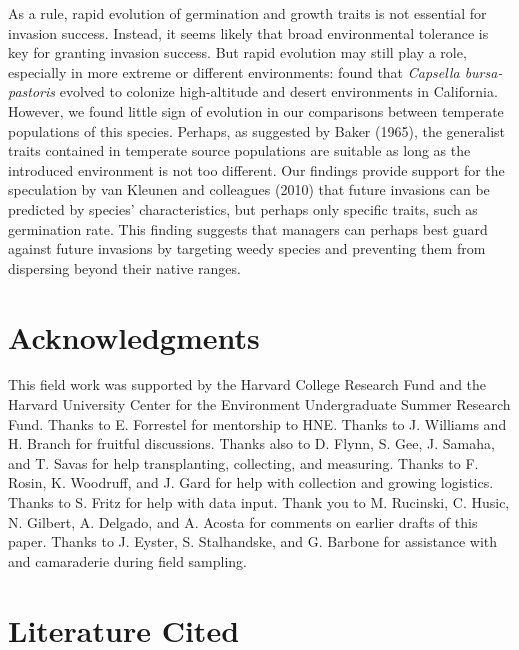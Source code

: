 \documentclass[12pt]{article}\usepackage[]{graphicx}\usepackage[]{color}
\begin{document}
	As a rule, rapid evolution of germination and growth traits is not essential for invasion success. Instead, it seems likely that broad environmental tolerance is key for granting invasion success.  But rapid evolution may still play a role, especially in more extreme or different environments:  \textcite{Linde2001} found that \textit{Capsella bursa-pastoris} evolved to colonize high-altitude and desert environments in California. However, we found little sign of evolution in our comparisons between temperate populations of this species. Perhaps, as suggested by Baker (1965), the generalist traits contained in temperate source populations are suitable as long as the introduced environment is not too different. Our findings provide support for  the speculation by van Kleunen and colleagues (2010) that future invasions can be predicted by species' characteristics, but perhaps only specific traits, such as germination rate. This finding suggests that managers can perhaps best guard against future invasions by targeting weedy species and preventing them from dispersing beyond their native ranges. 

	
\section{Acknowledgments}
This field work was supported by the Harvard College Research Fund and the Harvard University Center for the Environment Undergraduate Summer Research Fund. Thanks to E. Forrestel for mentorship to HNE. Thanks to J. Williams and H. Branch for fruitful discussions. Thanks also to D. Flynn, S. Gee, J. Samaha, and T. Savas for help transplanting, collecting, and measuring. Thanks to F. Rosin, K. Woodruff, and J. Gard for help with collection and growing logistics. Thanks to S. Fritz for help with data input. Thank you to M. Rucinski, C. Husic, N. Gilbert, A. Delgado, and A. Acosta for comments on earlier drafts of this paper. Thanks to J. Eyster, S. Stalhandske, and G. Barbone for assistance with and camaraderie during field sampling. 

	

\section{Literature Cited}
\printbibliography
\end{document}

